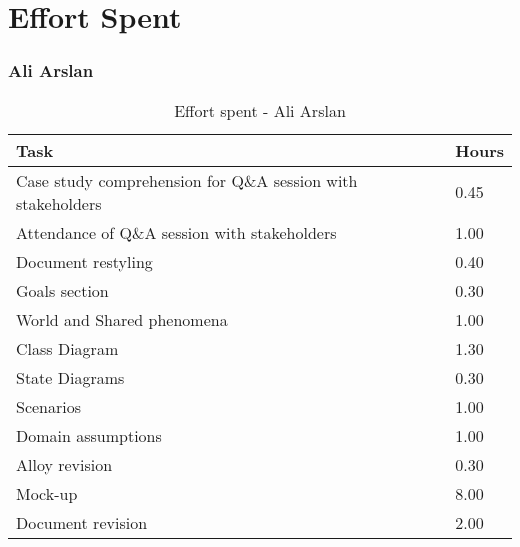 \chapter{Effort Spent}

\subsection{Ali Arslan}
\renewcommand{\arraystretch}{1.8}
\begin{longtable}{|m{9cm}|m{1.2cm}|}
\caption{Effort spent - Ali Arslan}\\
\hline
\endfirsthead
\endhead
\hline
\endlastfoot
\rowcolor{green2}
\textbf{Task} & \hfil {\textbf{Hours}}\\
\hline
Case study comprehension for Q\&A session with stakeholders & \hfil 0.45\\
Attendance of Q\&A session with stakeholders & \hfil 1.00\\
Document restyling	& \hfil 0.40\\
Goals section & \hfil 0.30\\
World and Shared phenomena & \hfil 1.00\\
Class Diagram & \hfil 1.30\\
State Diagrams & \hfil 0.30\\
Scenarios & \hfil 1.00\\
Domain assumptions & \hfil 1.00\\
Alloy revision & \hfil 0.30\\
Mock-up  & \hfil 8.00\\
Document revision & \hfil 2.00\\
\end{longtable}


